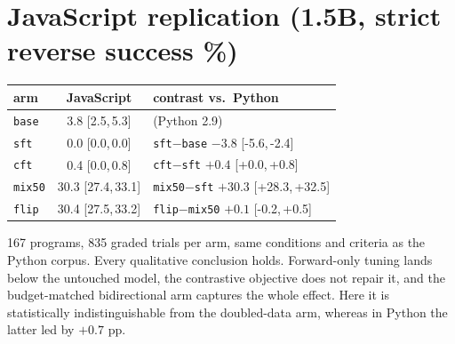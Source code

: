 \documentclass{article}
\newcommand{\arm}[1]{\texttt{#1}}
\newcommand{\ci}[2]{{\small[#1,\,#2]}}
\begin{document}
\section{JavaScript replication (1.5B, strict reverse success \%)}
\label{app:js}
\begin{center}\small
\begin{tabular}{lcl}
\toprule
arm & JavaScript & contrast vs.\ Python \\
\midrule
\arm{base} & 3.8 \ci{2.5}{5.3} & (Python 2.9) \\
\arm{sft}  & 0.0 \ci{0.0}{0.0} & \arm{sft}$-$\arm{base} $-3.8$ \ci{-5.6}{-2.4} \\
\arm{cft}  & 0.4 \ci{0.0}{0.8} & \arm{cft}$-$\arm{sft} $+0.4$ \ci{+0.0}{+0.8} \\
\arm{mix50} & 30.3 \ci{27.4}{33.1} & \arm{mix50}$-$\arm{sft} $+30.3$ \ci{+28.3}{+32.5} \\
\arm{flip} & 30.4 \ci{27.5}{33.2} & \arm{flip}$-$\arm{mix50} $+0.1$ \ci{-0.2}{+0.5} \\
\bottomrule
\end{tabular}
\end{center}
167 programs, 835 graded trials per arm, same conditions and criteria as the Python
corpus. Every qualitative conclusion holds. Forward-only tuning lands below the untouched
model, the contrastive objective does not repair it, and the budget-matched bidirectional
arm captures the whole effect. Here it is statistically indistinguishable from the
doubled-data arm, whereas in Python the latter led by $+0.7$ pp.

\end{document}
